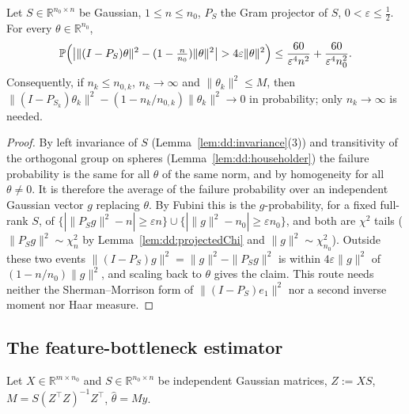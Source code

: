 \begin{theorem}\label{thm:dd:projectorProbability}
  \leanok
Let $S\in\mathbb R^{n_0\times n}$ be Gaussian, $1\le n\le n_0$, $P_S$ the Gram projector of $S$, $0<\varepsilon\le\tfrac12$. For every $\theta\in\mathbb R^{n_0}$,
\[
  \mathbb P\Bigl(\bigl|\|(I-P_S)\theta\|^2-(1-\tfrac n{n_0})\|\theta\|^2\bigr|>4\varepsilon\|\theta\|^2\Bigr)\le\frac{60}{\varepsilon^4n^2}+\frac{60}{\varepsilon^4n_0^2}.
\]
Consequently, if $n_k\le n_{0,k}$, $n_k\to\infty$ and $\|\theta_k\|^2\le M$, then $\|(I-P_{S_k})\theta_k\|^2-(1-n_k/n_{0,k})\|\theta_k\|^2\to0$ in probability; only $n_k\to\infty$ is needed.
\end{theorem}

\begin{proof}
  \leanok
By left invariance of $S$ (Lemma~\ref{lem:dd:invariance}(3)) and transitivity of the orthogonal group on spheres (Lemma~\ref{lem:dd:householder}) the failure probability is the same for all $\theta$ of the same norm,
and by homogeneity for all $\theta\neq0$. It is therefore the average of the failure probability over an independent Gaussian vector $g$ replacing $\theta$. By Fubini this is the $g$-probability, for a fixed full-rank $S$, of
$\{|\|P_Sg\|^2-n|\ge\varepsilon n\}\cup\{|\|g\|^2-n_0|\ge\varepsilon n_0\}$, and both are $\chi^2$ tails ($\|P_Sg\|^2\sim\chi^2_n$ by Lemma~\ref{lem:dd:projectedChi} and $\|g\|^2\sim\chi^2_{n_0}$).
Outside these two events $\|(I-P_S)g\|^2=\|g\|^2-\|P_Sg\|^2$ is within $4\varepsilon\|g\|^2$ of $(1-n/n_0)\|g\|^2$, and scaling back to $\theta$ gives the claim. This route needs neither the Sherman--Morrison form of $\|(I-P_S)e_1\|^2$ nor a second inverse moment nor Haar measure.
\end{proof}

\subsection{The feature-bottleneck estimator}

Let $X\in\mathbb R^{m\times n_0}$ and $S\in\mathbb R^{n_0\times n}$ be independent Gaussian matrices, $Z:=XS$, $M=S(Z^\top Z)^{-1}Z^\top$, $\hat\theta=My$.

